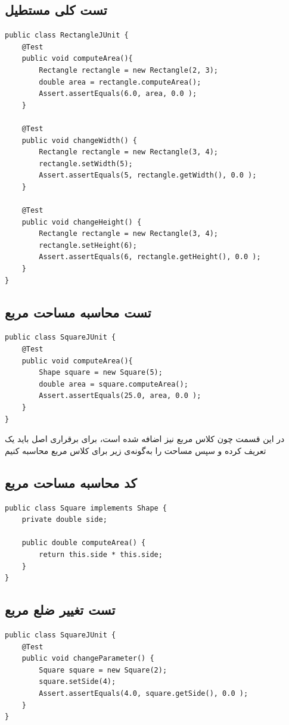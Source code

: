 \subsection*{تست کلی مستطیل}
\begin{Verbatim}[tabsize=4]
public class RectangleJUnit {
	@Test
	public void computeArea(){
		Rectangle rectangle = new Rectangle(2, 3);
		double area = rectangle.computeArea();
		Assert.assertEquals(6.0, area, 0.0 );
	}
	
	@Test
	public void changeWidth() {
		Rectangle rectangle = new Rectangle(3, 4);
		rectangle.setWidth(5);
		Assert.assertEquals(5, rectangle.getWidth(), 0.0 );
	}
	
	@Test
	public void changeHeight() {
		Rectangle rectangle = new Rectangle(3, 4);
		rectangle.setHeight(6);
		Assert.assertEquals(6, rectangle.getHeight(), 0.0 );
	}
}
\end{Verbatim}

\subsection*{تست محاسبه مساحت مربع}
\begin{Verbatim}
public class SquareJUnit {
	@Test
	public void computeArea(){
		Shape square = new Square(5);
		double area = square.computeArea();
		Assert.assertEquals(25.0, area, 0.0 );
	}
}
\end{Verbatim}
در این قسمت چون کلاس مربع نیز اضافه شده است، برای برقراری اصل  باید یک  تعریف کرده و سپس مساحت را به‌گونه‌ی زیر برای کلاس مربع محاسبه کنیم
\subsection*{کد محاسبه مساحت مربع}
\begin{Verbatim}
public class Square implements Shape {
	private double side;
	
	public double computeArea() {
		return this.side * this.side;
	}
}
\end{Verbatim}

\subsection*{تست تغییر ضلع مربع}
\begin{Verbatim}
public class SquareJUnit {
	@Test
	public void changeParameter() {
		Square square = new Square(2);
		square.setSide(4);
		Assert.assertEquals(4.0, square.getSide(), 0.0 );
	}
}
\end{Verbatim}

